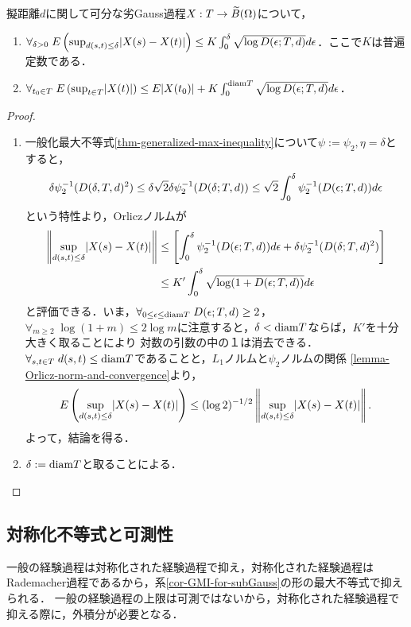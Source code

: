 \documentclass[uplatex,dvipdfmx]{jsreport}
\begin{document}
\begin{corollary}[劣Gauss過程に関する一般化最大不等式]\label{cor-GMI-for-subGauss}
    擬距離$d$に関して可分な劣Gauss過程$X:T\to\widetilde{B}(\Omega)$について，
    \begin{enumerate}
        \item $\forall_{\delta>0}\;E\left(\sup_{d(s,t)\le\delta}\lvert X(s)-X(t)\rvert\right)\le K\int^\delta_0\sqrt{\log D(\epsilon;T,d)}d\epsilon$．ここで$K$は普遍定数である．
        \item $\forall_{t_0\in T}\;E\left(\sup_{t\in T}\lvert X(t)\rvert\right)\le E\lvert X(t_0)\rvert+K\int^{\mathrm{diam} T}_0\sqrt{\log D(\epsilon;T,d)}d\epsilon$．
    \end{enumerate}
\end{corollary}
\begin{proof}\mbox{}
    \begin{enumerate}
        \item 一般化最大不等式\ref{thm-generalized-max-inequality}について$\psi:=\psi_2,\eta=\delta$とすると，
        \[\delta\psi_2^{-1}(D(\delta,T,d)^2)\le\delta\sqrt{2}\delta\psi_2^{-1}(D(\delta;T,d))\le\sqrt{2}\int^\delta_0\psi^{-1}_2(D(\epsilon;T,d))d\epsilon\]
        という特性より，Orliczノルムが
        \begin{align*}
            \left\|\sup_{d(s,t)\le\delta}\lvert X(s)-X(t)\rvert\right\|&\le\left[\int^\delta_0\psi^{-1}_2(D(\epsilon;T,d))d\epsilon+\delta\psi^{-1}_2(D(\delta;T,d)^2)\right]\\
            &\le K'\int^\delta_0\sqrt{\log(1+D(\epsilon;T,d))}d\epsilon
        \end{align*}
        と評価できる．いま，$\forall_{0\le\epsilon\le\mathrm{diam} T}\;D(\epsilon;T,d)\ge 2$，$\forall_{m\ge 2}\;\log(1+m)\le 2\log m$に注意すると，$\delta<\mathrm{diam} T$ならば，$K'$を十分大きく取ることにより
        対数の引数の中の１は消去できる．
        $\forall_{s,t\in T}\;d(s,t)\le\mathrm{diam} T$であることと，$L_1$ノルムと$\psi_2$ノルムの関係
        \ref{lemma-Orlicz-norm-and-convergence}より，
        \[E\left(\sup_{d(s,t)\le\delta}\lvert X(s)-X(t)\rvert\right)\le(\log2)^{-1/2}\left\|\sup_{d(s,t)\le\delta}\lvert X(s)-X(t)\rvert\right\|.\]
        よって，結論を得る．
        \item $\delta:=\mathrm{diam} T$と取ることによる．
    \end{enumerate}
\end{proof}

\subsection{対称化不等式と可測性}

\begin{tcolorbox}[colframe=ForestGreen, colback=ForestGreen!10!white,breakable,colbacktitle=ForestGreen!40!white,coltitle=black,fonttitle=\bfseries\sffamily,
title=道具２：対称化という技法]
    一般の経験過程は対称化された経験過程で抑え，対称化された経験過程はRademacher過程であるから，系\ref{cor-GMI-for-subGauss}の形の最大不等式で抑えられる．
    一般の経験過程の上限は可測ではないから，対称化された経験過程で抑える際に，外積分が必要となる．
\end{tcolorbox}
\end{document}
